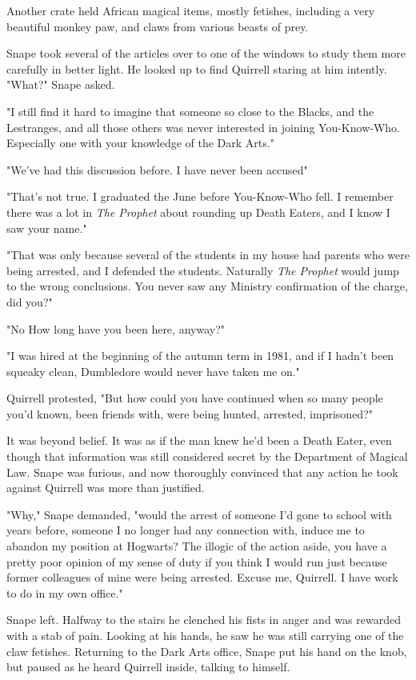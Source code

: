 Another crate held African magical items, mostly fetishes, including a very beautiful monkey paw, and claws from various beasts of prey.

Snape took several of the articles over to one of the windows to study them more carefully in better light. He looked up to find Quirrell staring at him intently. "What?" Snape asked.

"I still find it hard to imagine that someone so close to the Blacks, and the Lestranges, and all those others was never interested in joining You-Know-Who. Especially one with your knowledge of the Dark Arts."

"We've had this discussion before. I have never been accused{\el}"

"That's not true. I graduated the June before You-Know-Who fell. I remember there was a lot in \emph{The Prophet} about rounding up Death Eaters, and I know I saw your name."

"That was only because several of the students in my house had parents who were being arrested, and I defended the students. Naturally \emph{The Prophet} would jump to the wrong conclusions. You never saw any Ministry confirmation of the charge, did you?"

"No{\el} How long have you been here, anyway?"

"I was hired at the beginning of the autumn term in 1981, and if I hadn't been squeaky clean, Dumbledore would never have taken me on."

Quirrell protested, "But how could you have continued when so many people you'd known, been friends with, were being hunted, arrested, imprisoned?"

It was beyond belief. It was as if the man knew he'd been a Death Eater, even though that information was still considered secret by the Department of Magical Law. Snape was furious, and now thoroughly convinced that any action he took against Quirrell was more than justified.

"Why," Snape demanded, "would the arrest of someone I'd gone to school with years before, someone I no longer had any connection with, induce me to abandon my position at Hogwarts? The illogic of the action aside, you have a pretty poor opinion of my sense of duty if you think I would run just because former colleagues of mine were being arrested. Excuse me, Quirrell. I have work to do in my own office."

Snape left. Halfway to the stairs he clenched his fists in anger and was rewarded with a stab of pain. Looking at his hands, he saw he was still carrying one of the claw fetishes. Returning to the Dark Arts office, Snape put his hand on the knob, but paused as he heard Quirrell inside, talking to himself.

